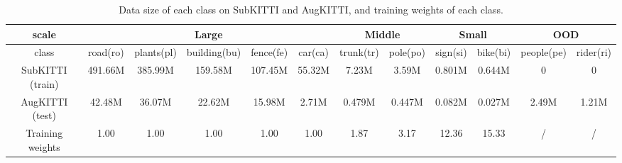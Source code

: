 \documentclass[journal]{IEEEtran}
\begin{document}
\begin{table*}[b]
	\centering
	\renewcommand{\arraystretch}{1.3}
	\caption{Data size of each class on SubKITTI and AugKITTI, and training weights of each class.}
	\begin{tabular}{c|ccccc|cc|cc|cc}
		\hline
		scale & \multicolumn{5}{c|}{Large}    & \multicolumn{2}{c|}{Middle}    & \multicolumn{2}{c|}{Small}    & \multicolumn{2}{c}{OOD}  \\ \hline
		class & road(ro)    & plants(pl)    & building(bu) & fence(fe)   & car(ca)    & trunk(tr)  & pole(po) & sign(si) &  bike(bi) & people(pe) & rider(ri)\\ \hline	
		SubKITTI (train) & 491.66M & 385.99M & 159.58M & 107.45M & 55.32M & 7.23M & 3.59M & 0.801M & 0.644M & 0 & 0  \\
		AugKITTI (test) & 42.48M & 36.07M & 22.62M & 15.98M & 2.71M & 0.479M & 0.447M & 0.082M & 0.027M & 2.49M & 1.21M  \\ \hline
		Training weights & 1.00 & 1.00 & 1.00 & 1.00 & 1.00 & 1.87 & 3.17 & 12.36 & 15.33 & / & / \\
		\hline
	\end{tabular}	
	\label{tab:dataset2}
	\vspace{-3mm}
\end{table*}

%
%	
%	

\end{document}
